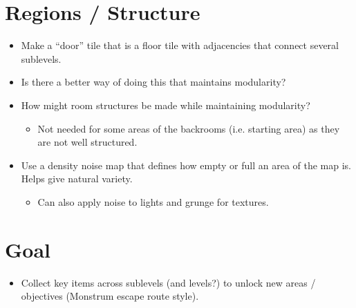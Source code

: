 \section*{Regions / Structure}
\begin{itemize}
    \item Make a ``door'' tile that is a floor tile with adjacencies that connect several sublevels.
    \item Is there a better way of doing this that maintains modularity?
    \item How might room structures be made while maintaining modularity?
          \begin{itemize}
              \item Not needed for some areas of the backrooms (i.e. starting area) as they are not well structured.
          \end{itemize}
    \item Use a density noise map that defines how empty or full an area of the map is. Helps give natural variety.
          \begin{itemize}
              \item Can also apply noise to lights and grunge for textures.
          \end{itemize}
\end{itemize}

\section*{Goal}
\begin{itemize}
    \item Collect key items across sublevels (and levels?) to unlock new areas / objectives (Monstrum escape route style).
\end{itemize}

